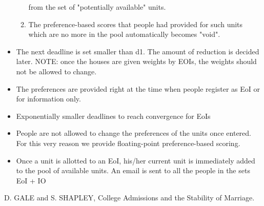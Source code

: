 \documentclass[a4paper,10pt]{article}
\begin{document}
\begin{itemize}
\begin{enumerate}
    from the set of "potentially available" units.
  \item The preference-based scores that people had provided for such
    units which are no more in the pool automatically becomes "void".
  \end{enumerate}
\item The next deadline is set smaller than d1. The amount of reduction 
  is decided   later.
  NOTE: once the houses are given weights by EOIs, the
  weights should not be allowed to change.  
\item  The preferences are provided right at the time when people register 
as EoI or for information only.  
\item  Exponentially smaller deadlines to reach convergence for EoIs
\item People are not allowed to change the preferences of the units once
entered. For this very reason we provide floating-point
preference-based scoring.
\item Once a unit is allotted to an EoI, his/her current unit is immediately
added to the pool of available units. An email is sent to all the people 
in the sets EoI + IO
\end{itemize}



\begin{thebibliography}{9}
D. GALE and S. SHAPLEY, 
College Admissions and the Stability of Marriage. 

\end{thebibliography}
\end{document}
